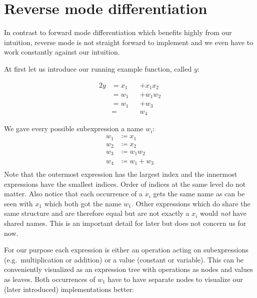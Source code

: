 \chapter{Reverse mode differentiation}\label{sec:reverseMode}

In contrast to forward mode differentiation which benefits highly from our intuition, reverse mode is not straight forward to implement and we even have to work constantly against our intuition.

At first let us introduce our running example function, called $y$:
\newcommand{\yExampleDiff}{
    \begin{alignat*}{2}
        y & = x_1 &  & + x_1 x_2 \\
          & = w_1 &  & + w_1 w_2 \\
          & = w_1    &  & + w_3       \\
          & =        &  & w_4
    \end{alignat*}
}
\yExampleDiff
We gave every possible subexpression a name $w_i$:
\begin{align*}
    w_1 &\coloneqq x_1 \\
    w_2 &\coloneqq x_2 \\
    w_3 &\coloneqq w_1 w_2 \\
    w_4 &\coloneqq w_1 + w_3 \\
\end{align*}
Note that the outermost expression has the largest index and the innermost expressions have the smallest indices. Order of indices at the same level do not matter. Also notice that each occurrence of a $x_i$ gets the same name as can be seen with $x_1$ which both got the name $w_1$. Other expressions which do share the same structure and are therefore equal but are not exactly a $x_i$ would \emph{not} have shared names. This is an important detail for later but does not concern us for now.

For our purpose each expression is either an operation acting on subexpressions (e.g.\ multiplication or addition) or a value (constant or variable). This can be conveniently visualized as an expression tree with operations as nodes and values as leaves. Both occurrences of $w_1$ have to have separate nodes to visualize our (later introduced) implementations better:

